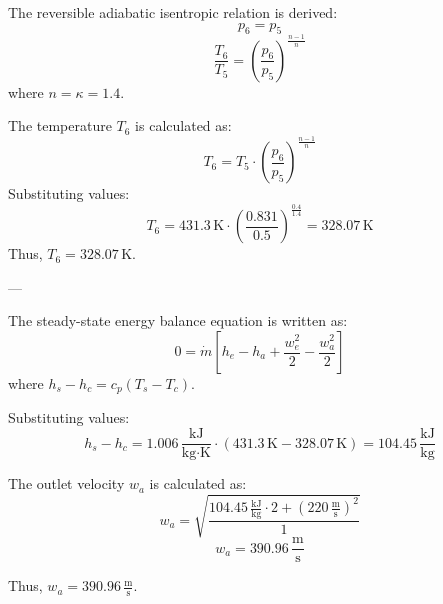 The reversible adiabatic isentropic relation is derived:  
\[
p_6 = p_5
\]
\[
\frac{T_6}{T_5} = \left( \frac{p_6}{p_5} \right)^{\frac{n-1}{n}}
\]
where \( n = \kappa = 1.4 \).  

The temperature \( T_6 \) is calculated as:  
\[
T_6 = T_5 \cdot \left( \frac{p_6}{p_5} \right)^{\frac{n-1}{n}}
\]
Substituting values:  
\[
T_6 = 431.3 \, \text{K} \cdot \left( \frac{0.831}{0.5} \right)^{\frac{0.4}{1.4}} = 328.07 \, \text{K}
\]
Thus, \( T_6 = 328.07 \, \text{K} \).  

---

The steady-state energy balance equation is written as:  
\[
0 = \dot{m} \left[ h_e - h_a + \frac{w_e^2}{2} - \frac{w_a^2}{2} \right]
\]
where \( h_s - h_c = c_p (T_s - T_c) \).  

Substituting values:  
\[
h_s - h_c = 1.006 \, \frac{\text{kJ}}{\text{kg·K}} \cdot (431.3 \, \text{K} - 328.07 \, \text{K}) = 104.45 \, \frac{\text{kJ}}{\text{kg}}
\]

The outlet velocity \( w_a \) is calculated as:  
\[
w_a = \sqrt{\frac{104.45 \, \frac{\text{kJ}}{\text{kg}} \cdot 2 + (220 \, \frac{\text{m}}{\text{s}})^2}{1}}
\]
\[
w_a = 390.96 \, \frac{\text{m}}{\text{s}}
\]  

Thus, \( w_a = 390.96 \, \frac{\text{m}}{\text{s}} \).
